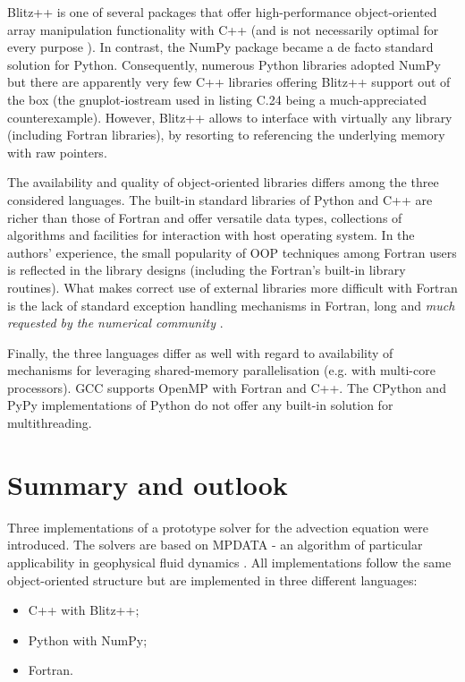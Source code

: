 \documentclass[final,5p,times,twocolumn]{elsarticle}
\begin{document}
  Blitz++ is one of several packages that offer high-performance object-oriented
    array manipulation functionality with C++ (and is not necessarily optimal for every
    purpose \citep{Iglberger_et_al_2012}).
  In contrast, the NumPy package became a de facto standard solution for Python.
  Consequently, numerous Python libraries adopted NumPy but
    there are apparently very few C++ libraries offering Blitz++ support out of the box
    (the gnuplot-iostream used in listing C.24 being a much-appreciated counterexample).
  However, Blitz++ allows to interface with virtually any library (including Fortran libraries), 
    by resorting to referencing the underlying memory with raw pointers.
 
  The availability and quality of object-oriented 
    libraries differs among the three considered languages.
  The built-in standard libraries of Python and C++ are richer than
    those of Fortran and offer versatile data types, collections of
    algorithms and facilities for interaction with host operating system.
  In the authors' experience, the small popularity of OOP techniques among
    Fortran users is reflected in the library designs (including the Fortran's
    built-in library routines).
  What makes correct use of external libraries more difficult with Fortran
    is the lack of standard exception handling mechanisms in Fortran,
    long and {\em much requested by the numerical community} \citep[][Foreword]{Press_et_al_1996}.

  Finally, the three languages differ as well with regard to availability of 
    mechanisms for leveraging shared-memory parallelisation (e.g. with multi-core processors).
  GCC supports OpenMP with Fortran and C++.
  The CPython and PyPy implementations of Python do not offer any
    built-in solution for multithreading. 
  
  \section{Summary and outlook}

  Three implementations of a prototype solver 
    for the advection equation were introduced.
  The solvers are based on MPDATA - an algorithm of particular applicability
    in geophysical fluid dynamics \citep{Smolarkiewicz_2006}.
  All implementations follow the same object-oriented structure but are implemented
    in three different languages:
  \begin{itemize}
    \item{C++ with Blitz++;}
    \item{Python with NumPy;}
    \item{Fortran.}
  \end{itemize}
\end{document}
